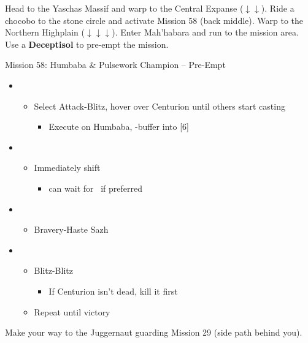Head to the Yaschas Massif and warp to the Central Expanse ($\downarrow\downarrow$).
Ride a chocobo to the stone circle and activate Mission 58 (back middle).
Warp to the Northern Highplain ($\downarrow\downarrow\downarrow$).
Enter Mah'habara and run to the mission area.
Use a \textbf{Deceptisol} to pre-empt the mission.

\begin{battle}{Mission 58: Humbaba \& Pulsework Champion -- Pre-Empt}
	\begin{itemize}
		\item \third
			\begin{itemize}
				\item Select Attack-Blitz, hover over Centurion until others start casting
					\begin{itemize}
						\item Execute on Humbaba, \rav-buffer into [6]
					\end{itemize}
			\end{itemize}
		\item \sixth
			\begin{itemize}
				\item Immediately shift
					\begin{itemize}
						\item can wait for \stagger~if preferred
					\end{itemize}
			\end{itemize}
		\item \fourth
			\begin{itemize}
				\item Bravery-Haste Sazh
			\end{itemize}
		\item \second
			\begin{itemize}
				\item Blitz-Blitz
					\begin{itemize}
						\item If Centurion isn't dead, kill it first
					\end{itemize}
				\item Repeat until victory
			\end{itemize}
	\end{itemize}
\end{battle}

Make your way to the Juggernaut guarding Mission 29 (side path behind you).

